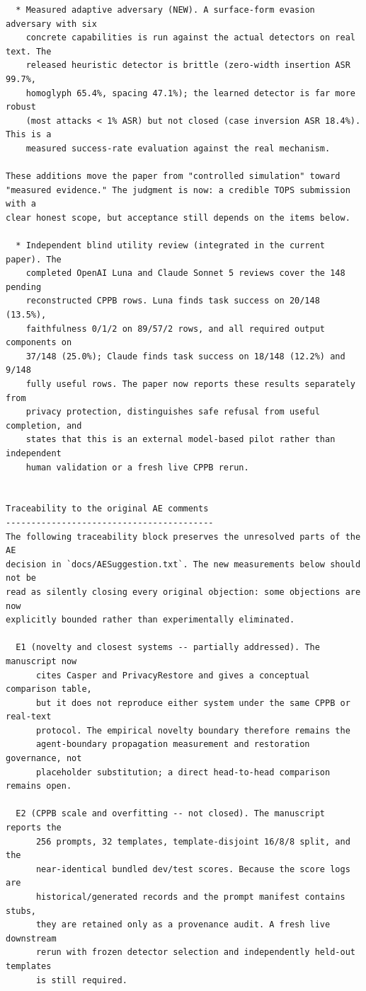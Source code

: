 \documentclass[10pt]{article}
\begin{document}
\begin{verbatim}
  * Measured adaptive adversary (NEW). A surface-form evasion adversary with six
    concrete capabilities is run against the actual detectors on real text. The
    released heuristic detector is brittle (zero-width insertion ASR 99.7%,
    homoglyph 65.4%, spacing 47.1%); the learned detector is far more robust
    (most attacks < 1% ASR) but not closed (case inversion ASR 18.4%). This is a
    measured success-rate evaluation against the real mechanism.

These additions move the paper from "controlled simulation" toward
"measured evidence." The judgment is now: a credible TOPS submission with a
clear honest scope, but acceptance still depends on the items below.

  * Independent blind utility review (integrated in the current paper). The
    completed OpenAI Luna and Claude Sonnet 5 reviews cover the 148 pending
    reconstructed CPPB rows. Luna finds task success on 20/148 (13.5%),
    faithfulness 0/1/2 on 89/57/2 rows, and all required output components on
    37/148 (25.0%); Claude finds task success on 18/148 (12.2%) and 9/148
    fully useful rows. The paper now reports these results separately from
    privacy protection, distinguishes safe refusal from useful completion, and
    states that this is an external model-based pilot rather than independent
    human validation or a fresh live CPPB rerun.


Traceability to the original AE comments
-----------------------------------------
The following traceability block preserves the unresolved parts of the AE
decision in `docs/AESuggestion.txt`. The new measurements below should not be
read as silently closing every original objection: some objections are now
explicitly bounded rather than experimentally eliminated.

  E1 (novelty and closest systems -- partially addressed). The manuscript now
      cites Casper and PrivacyRestore and gives a conceptual comparison table,
      but it does not reproduce either system under the same CPPB or real-text
      protocol. The empirical novelty boundary therefore remains the
      agent-boundary propagation measurement and restoration governance, not
      placeholder substitution; a direct head-to-head comparison remains open.

  E2 (CPPB scale and overfitting -- not closed). The manuscript reports the
      256 prompts, 32 templates, template-disjoint 16/8/8 split, and the
      near-identical bundled dev/test scores. Because the score logs are
      historical/generated records and the prompt manifest contains stubs,
      they are retained only as a provenance audit. A fresh live downstream
      rerun with frozen detector selection and independently held-out templates
      is still required.


\end{verbatim}
\end{document}
